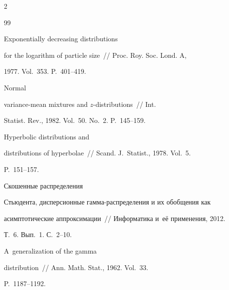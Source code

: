 \begin{multicols}{2}
{{ \begin{thebibliography}{99}




 Exponentially decreasing distributions


for the logarithm of particle size~// Proc. Roy. Soc. Lond. A,


1977. Vol.~353. P.~401--419.







 Normal


variance-mean mixtures and $z$-distributions~// Int.


Statist. Rev., 1982. Vol.~50. No.~2. P.~145--159.







 Hyperbolic distributions and


distributions of hyperbolae~// Scand. J.~Statist., 1978. Vol.~5.


P.~151--157.













 Скошенные распределения


Стьюдента, дисперсионные гам\-ма-рас\-пре\-де\-ле\-ния и их обобщения как


асимптотические аппроксимации~// Информатика и~её применения, 2012.


Т.~6. Вып.~1. С.~2--10.







 A~generalization of the gamma


distribution~// Ann. Math. Stat., 1962. Vol.~33.


P.~1187--1192.










\end{thebibliography}}}
\end{multicols}
